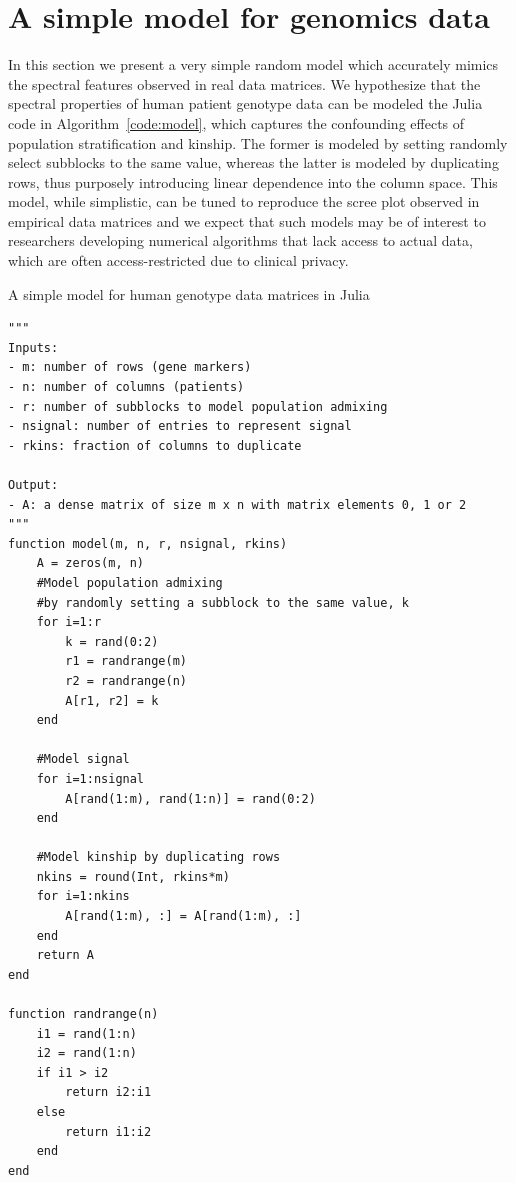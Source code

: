 \documentclass[review]{siamart0516}
\begin{document}
\label{sec:model}
\section{A simple model for genomics data}

In this section we present a very simple random model which accurately mimics
the spectral features observed in real data matrices.
We hypothesize that the spectral properties of human patient genotype data can
be modeled the Julia code in Algorithm~\ref{code:model}, which captures the
confounding effects of population stratification and kinship.
The former is modeled by setting randomly select subblocks to the same value,
whereas the latter is modeled by duplicating rows, thus purposely introducing
linear dependence into the column space. This model, while simplistic, can be
tuned to reproduce the scree plot observed in empirical data matrices and we
expect that such models may be of interest to researchers developing numerical
algorithms that lack access to actual data, which are often access-restricted
due to clinical privacy.

\begin{algorithm}
\caption{A simple model for human genotype data matrices in Julia
\label{code:model}}
\begin{lstlisting}
"""
Inputs:
- m: number of rows (gene markers)
- n: number of columns (patients)
- r: number of subblocks to model population admixing
- nsignal: number of entries to represent signal
- rkins: fraction of columns to duplicate

Output:
- A: a dense matrix of size m x n with matrix elements 0, 1 or 2
"""
function model(m, n, r, nsignal, rkins)
    A = zeros(m, n)
    #Model population admixing
    #by randomly setting a subblock to the same value, k
    for i=1:r
        k = rand(0:2)
        r1 = randrange(m)
        r2 = randrange(n)
        A[r1, r2] = k
    end

    #Model signal
    for i=1:nsignal
        A[rand(1:m), rand(1:n)] = rand(0:2)
    end

    #Model kinship by duplicating rows
    nkins = round(Int, rkins*m)
    for i=1:nkins
        A[rand(1:m), :] = A[rand(1:m), :]
    end
    return A
end

function randrange(n)
    i1 = rand(1:n)
    i2 = rand(1:n)
    if i1 > i2
        return i2:i1
    else
        return i1:i2
    end
end
\end{lstlisting}
\end{algorithm}
\end{document}
